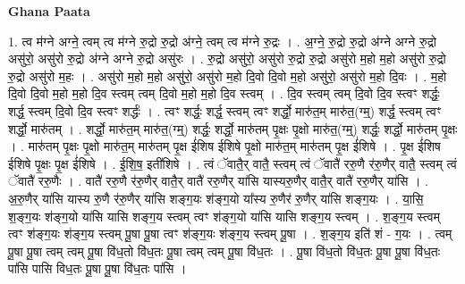 \documentclass[17pt]{extarticle}
\begin{document}
\textbf{Ghana Paata } \newline

1. त्व म॑ग्ने अग्ने॒ त्वम् त्व म॑ग्ने रु॒द्रो रु॒द्रो अ॑ग्ने॒ त्वम् त्व म॑ग्ने रु॒द्रः । . अ॒ग्ने॒ रु॒द्रो रु॒द्रो अ॑ग्ने अग्ने रु॒द्रो असु॑रो॒ असु॑रो रु॒द्रो अ॑ग्ने अग्ने रु॒द्रो असु॑रः । . रु॒द्रो असु॑रो॒ असु॑रो रु॒द्रो रु॒द्रो असु॑रो म॒हो म॒हो असु॑रो रु॒द्रो रु॒द्रो असु॑रो म॒हः । . असु॑रो म॒हो म॒हो असु॑रो॒ असु॑रो म॒हो दि॒वो दि॒वो म॒हो असु॑रो॒ असु॑रो म॒हो दि॒वः । . म॒हो दि॒वो दि॒वो म॒हो म॒हो दि॒व स्त्वम् त्वम् दि॒वो म॒हो म॒हो दि॒व स्त्वम् । . दि॒व स्त्वम् त्वम् दि॒वो दि॒व स्त्वꣳ शर्द्धः॒ शर्द्ध॒ स्त्वम् दि॒वो दि॒व स्त्वꣳ शर्द्धः॑ । . त्वꣳ शर्द्धः॒ शर्द्ध॒ स्त्वम् त्वꣳ शर्द्धो॒ मारु॑त॒म् मारु॑त॒(ग्म्॒) शर्द्ध॒ स्त्वम् त्वꣳ शर्द्धो॒ मारु॑तम् । . शर्द्धो॒ मारु॑त॒म् मारु॑त॒(ग्म्॒) शर्द्धः॒ शर्द्धो॒ मारु॑तम् पृ॒क्षः पृ॒क्षो मारु॑त॒(ग्म्॒) शर्द्धः॒ शर्द्धो॒ मारु॑तम् पृ॒क्षः । . मारु॑तम् पृ॒क्षः पृ॒क्षो मारु॑त॒म् मारु॑तम् पृ॒क्ष ई॑शिष ईशिषे पृ॒क्षो मारु॑त॒म् मारु॑तम् पृ॒क्ष ई॑शिषे । . पृ॒क्ष ई॑शिष ईशिषे पृ॒क्षः पृ॒क्ष ई॑शिषे । . ई॒शि॒ष॒ इती॑शिषे । . त्वं ॅवातै॒र् वातै॒ स्त्वम् त्वं ॅवातै॑ ररु॒णै र॑रु॒णैर् वातै॒ स्त्वम् त्वं ॅवातै॑ ररु॒णैः । . वातै॑ ररु॒णै र॑रु॒णैर् वातै॒र् वातै॑ ररु॒णैर् या॑सि यास्यरु॒णैर् वातै॒र् वातै॑ ररु॒णैर् या॑सि । . अ॒रु॒णैर् या॑सि यास्य रु॒णै र॑रु॒णैर् या॑सि शङ्ग॒यः श॑ङ्ग॒यो या᳚स्य रु॒णैर॑ रु॒णैर् या॑सि शङ्ग॒यः । . या॒सि॒ श॒ङ्ग॒यः श॑ङ्ग॒यो या॑सि यासि शङ्ग॒य स्त्वम् त्वꣳ श॑ङ्ग॒यो या॑सि यासि शङ्ग॒य स्त्वम् । . श॒ङ्ग॒य स्त्वम् त्वꣳ श॑ङ्ग॒यः श॑ङ्ग॒य स्त्वम् पू॒षा पू॒षा त्वꣳ श॑ङ्ग॒यः श॑ङ्ग॒य स्त्वम् पू॒षा । . श॒ङ्ग॒य इति॑ शं - ग॒यः । . त्वम् पू॒षा पू॒षा त्वम् त्वम् पू॒षा वि॑ध॒तो वि॑ध॒तः पू॒षा त्वम् त्वम् पू॒षा वि॑ध॒तः । . पू॒षा वि॑ध॒तो वि॑ध॒तः पू॒षा पू॒षा वि॑ध॒तः पा॑सि पासि विध॒तः पू॒षा पू॒षा वि॑ध॒तः पा॑सि । \newline
\end{document}

